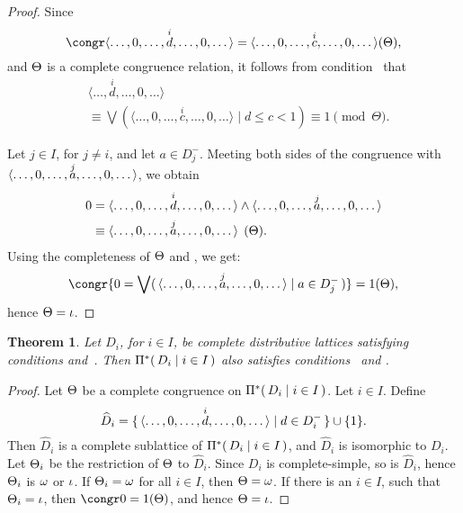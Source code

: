 \documentclass{amsart}
\theoremstyle{plain}
\newtheorem{theorem}{Theorem}
\theoremstyle{definition}
\theoremstyle{remark}
\numberwithin{equation}{section}
\newcommand{\Prodsm}[2]{\gP^{*}(\,#1\mid#2\,)}
\newcommand{\vectsup}[2]{\vect<\dots,0,\dots,\overset{#1}{#2},%
\dots,0,\dots>}%
\begin{document}
\begin{proof}  
   Since 
   \begin{equation}\label{E:cong2}
      \congr\vectsup{i}{d}=\vectsup{i}{c}(\gQ), 
   \end{equation}
   and $\gQ$ is a complete congruence relation, it follows 
   from condition~ that
   \begin{equation}\label{E:cong}
   \begin{split}
       &\langle \dots, \overset{i}{d}, \dots, 0,
        \dots \rangle\\
       &\equiv \bigvee ( \langle \dots, 0, \dots, 
        \overset{i}{c},\dots, 0,\dots \rangle \mid d \leq c < 1) 
         \equiv 1 \pmod{\Theta}. 
   \end{split}
   \end{equation}

   Let $j \in I$, for $j \neq i$, and let 
   $a \in D_{j}^{-}$. Meeting both sides of the congruence
    with $\vectsup{j}{a}$, we obtain
   \begin{equation}\label{E:comp}
      \begin{split}
          0 &= \vectsup{i}{d} \mm \vectsup{j}{a}\\
            &\equiv \vectsup{j}{a}\pod{\gQ}.
     \end{split} 
   \end{equation}
  Using the completeness of $\gQ$ and , we get:
   \begin{equation}\label{E:cong3}
       \congr{0=\JJm{ \vectsup{j}{a} }{ a \in D_{j}^{-} }}={1}(\gQ), 
   \end{equation}
   hence $\gQ = \gi$.
\end{proof}

\begin{theorem}\label{T:P*a}  
   Let $D_{i}$, for $i \in I$, be complete distributive 
   lattices satisfying
   conditions  and~. Then 
   $\Prodsm{ D_{i} }{i \in I}$ also satisfies 
   conditions~ and . 
\end{theorem}

\begin{proof}
   Let $\gQ$ be a complete congruence on 
   $\Prodsm{ D_{i} }{i \in I}$. Let $i \in I$. Define 
   \begin{equation}\label{E:dihat}
      \widehat{D}_{i} = \setm{ \vectsup{i}{d} }{ d \in D_{i}^{-} } 
       \uu \set{1}.
   \end{equation}
   Then $\widehat{D}_{i}$ is a complete sublattice of 
   $\Prodsm{ D_{i} }{i \in I}$, and $\widehat{D}_{i}$  
   is isomorphic to $D_{i}$. Let $\gQ_{i}$ be the 
   restriction of $\gQ$ to $\widehat{D}_{i}$. Since
   $D_{i}$ is complete-simple, so is $\widehat{D}_{i}$,
   hence $\gQ_{i}$ is $\go$ or $\gi$. If $\gQ_{i} = \go$ 
   for all $i \in I$, then $\gQ = \go$. 
   If there is an $i \in I$, such that $\gQ_{i} = \gi$, 
   then $\congr0=1(\gQ)$, and hence $\gQ = \gi$. 
\end{proof}
\end{document}
